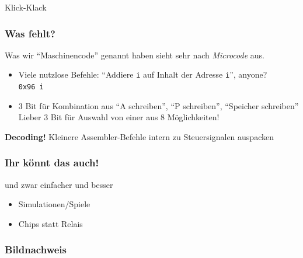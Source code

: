 \documentclass[t,aspectratio=169]{beamer}
\begin{document}
\begin{frame}[c]
  \begin{center}
    \Huge{Klick-Klack}
  \end{center}
\end{frame}

\begin{frame}
  \frametitle{Was fehlt?}

  Was wir \enquote{Maschinencode} genannt haben sieht sehr nach \emph{Microcode} aus.
  \begin{itemize}
  \item Viele nutzlose Befehle: \enquote{Addiere \texttt{i} auf Inhalt der Adresse \texttt{i}}, anyone?\\
    \texttt{0x96 i}
  \item 3 Bit für Kombination aus \enquote{A schreiben}, \enquote{P schreiben}, \enquote{Speicher schreiben}\\
    Lieber 3 Bit für Auswahl von einer aus 8 Möglichkeiten!

  \end{itemize}

  \bigskip\pause

  \textbf{Decoding!} Kleinere Assembler-Befehle intern zu Steuersignalen auspacken
\end{frame}

\begin{frame}
  \frametitle{Ihr könnt das auch!}

  und zwar einfacher und besser
  \begin{itemize}
  \item Simulationen/Spiele
  \item Chips statt Relais
  \end{itemize}
\end{frame}

\begin{frame}
  \frametitle{Bildnachweis}
  \tiny
  \begin{description}
  \end{description}
\end{frame}
\end{document}
